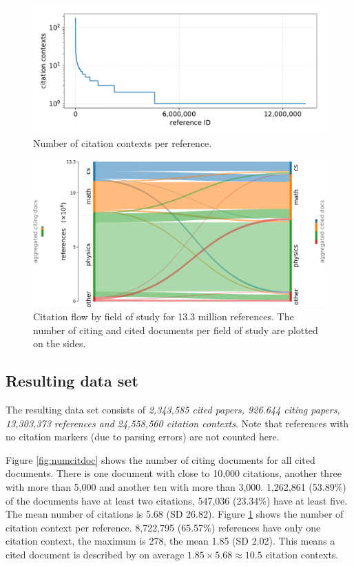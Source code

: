 \begin{figure}
  \centering
  \includegraphics[width=0.8\linewidth]{figures/dataset/citation_contexts_per_reference.pdf}
  \caption{Number of citation contexts per reference.}
  \label{fig:numcontref}
\end{figure}

\begin{figure}
  \centering
    \includegraphics[width=\textwidth]{figures/dataset/citation_relation_sankey.pdf}
  \caption[Citation flow by field of study for 13.3 million references.]{Citation flow by field of study for 13.3 million references. The number of citing and cited documents per field of study are plotted on the sides.}
  \label{fig:sankey}
\end{figure}

\subsection{Resulting data set}
The resulting data set consists of \emph{2,343,585 cited papers, 926.644 citing papers, 13,303,373 references and 24,558,560 citation contexts}. Note that references with no citation markers (due to parsing errors) are not counted here.

Figure \ref{fig:numcitdoc} shows the number of citing documents for all cited documents. There is one document with close to 10,000 citations, another three with more than 5,000 and another ten with more than 3,000. 1,262,861 (53.89\%) of the documents have at least two citations, 547,036 (23.34\%) have at least five. The mean number of citations is 5.68 (SD 26.82). Figure \ref{fig:numcontref} shows the number of citation context per reference. 8,722,795 (65.57\%) references have only one citation context, the maximum is 278, the mean 1.85 (SD 2.02). This means a cited document is described by on average $1.85 \times 5.68 \approx 10.5$ citation contexts.

